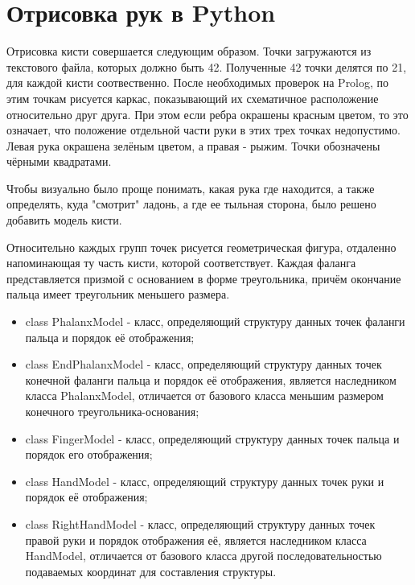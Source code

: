 \section{Отрисовка рук в Python}

\hspace{0.6cm} Отрисовка кисти совершается следующим образом. Точки загружаются из текстового файла, которых должно быть 42. Полученные 42 точки делятся по 21, для каждой кисти соотвественно. После необходимых проверок на Prolog, по этим точкам рисуется каркас, показывающий их схематичное расположение относительно друг друга. При этом если ребра окрашены красным цветом, то это означает, что положение отдельной части руки в этих трех точках недопустимо. Левая рука окрашена зелёным цветом, а правая - рыжим. Точки обозначены чёрными квадратами.

\hspace{0.6cm} Чтобы визуально было проще понимать, какая рука где находится, а также определять, куда "смотрит" ладонь, а где ее тыльная сторона, было решено добавить модель кисти.

\hspace{0.6cm} Относительно каждых групп точек рисуется геометрическая фигура, отдаленно напоминающая ту часть кисти, которой соответствует. Каждая фаланга представляется призмой с основанием в форме треугольника, причём окончание пальца имеет треугольник меньшего размера.

\begin{itemize}
	\item class PhalanxModel - класс, определяющий структуру данных точек фаланги пальца и порядок её отображения;
	\item class EndPhalanxModel - класс, определяющий структуру данных точек конечной фаланги пальца и порядок её отображения, является наследником класса PhalanxModel, отличается от базового класса меньшим размером конечного треугольника-основания;
	\item class FingerModel - класс, определяющий структуру данных точек пальца и порядок его отображения;
	\item class HandModel - класс, определяющий структуру данных точек руки и порядок её отображения;
	\item class RightHandModel - класс, определяющий структуру данных точек правой руки и порядок отображения её, является наследником класса HandModel, отличается от базового класса другой последовательностью подаваемых координат для составления структуры.
\end{itemize}


